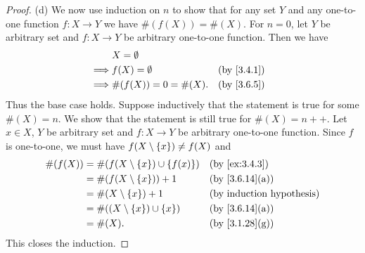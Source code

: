 \begin{proof}{(d)}
  We now use induction on \(n\) to show that for any set \(Y\) and any one-to-one function \(f : X \to Y\) we have \(\#(f(X)) = \#(X)\).
  For \(n = 0\), let \(Y\) be arbitrary set and \(f : X \to Y\) be arbitrary one-to-one function.
  Then we have
  \begin{align*}
             & X = \emptyset                         \\
    \implies & f(X) = \emptyset      &  & \by{3.4.1} \\
    \implies & \#(f(X)) = 0 = \#(X). &  & \by{3.6.5}
  \end{align*}
  Thus the base case holds.
  Suppose inductively that the statement is true for some \(\#(X) = n\).
  We show that the statement is still true for \(\#(X) = n++\).
  Let \(x \in X\), \(Y\) be arbitrary set and \(f : X \to Y\) be arbitrary one-to-one function.
  Since \(f\) is one-to-one, we must have \(f(X \setminus \left\lbrace x\right\rbrace) \neq f(X)\) and
  \begin{align*}
    \#(f(X)) & = \#(f(X \setminus \set{x}) \cup \set{f(x)}) &  & \by{ex:3.4.3}                \\
             & = \#(f(X \setminus \set{x})) + 1             &  & \text{(by \cref{3.6.14}(a))} \\
             & = \#(X \setminus \set{x}) + 1                &  & \byIH                        \\
             & = \#((X \setminus \set{x}) \cup \set{x})     &  & \text{(by \cref{3.6.14}(a))} \\
             & = \#(X).                                     &  & \text{(by \cref{3.1.28}(g))}
  \end{align*}
  This closes the induction.
\end{proof}

